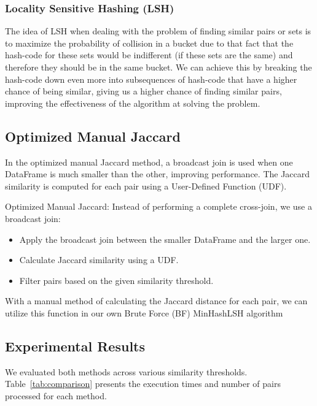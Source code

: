 \subsubsection{Locality Sensitive Hashing (LSH)}

The idea of LSH when dealing with the problem of finding similar pairs or sets is to maximize the probability of collision in a bucket due to that fact that the hash-code for these sets would be indifferent (if these sets are the same) and therefore they should be in the same bucket.
We can achieve this by breaking the hash-code down even more into subsequences of hash-code that have a higher chance of being similar, giving us a higher chance of finding similar pairs, improving the effectiveness of the algorithm at solving the problem.

\subsection{Optimized Manual Jaccard}
\label{subsec:optimized-manual-jaccard}
In the optimized manual Jaccard method, a broadcast join is used when one DataFrame is much smaller than the other, improving performance.
The Jaccard similarity is computed for each pair using a User-Defined Function (UDF).

Optimized Manual Jaccard: Instead of performing a complete cross-join, we use a broadcast join:
\begin{itemize}
    \item Apply the broadcast join between the smaller DataFrame and the larger one.
    \item Calculate Jaccard similarity using a UDF.
    \item Filter pairs based on the given similarity threshold.
\end{itemize}

With a manual method of calculating the Jaccard distance for each pair, we can utilize this function in our own Brute Force (BF) MinHashLSH algorithm

\subsection{Experimental Results}
\label{subsec:experimental-results2}
We evaluated both methods across various similarity thresholds.
Table~\ref{tab:comparison} presents the execution times and number of pairs processed for each method.

